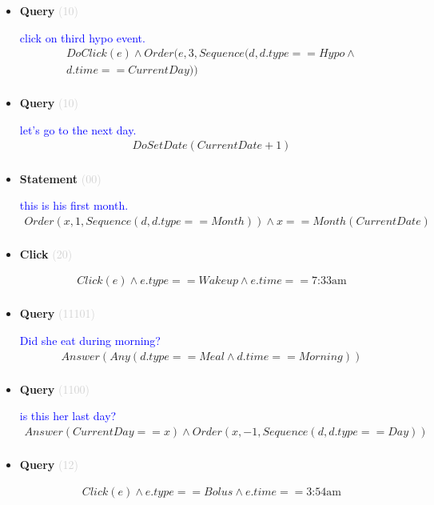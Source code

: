 \documentclass[11pt]{article}
\newcommand{\key}[1]{\textcolor{lightgray}{#1}}
\newcounter{CQuery}
\newcounter{CStatement}
\newcounter{CClick}
\begin{document}
\begin{itemize}
\item
\textbf{Query\theCQuery} \key{(10)} \addtocounter{CQuery}{1}
\textcolor{blue}{ click on third hypo event. }
\begin{multline*}
DoClick(e) \wedge  Order(e, 3, Sequence(d, d.type==Hypo \wedge \\ 
d.time==CurrentDay)) \\ 
\end{multline*}


\item
\textbf{Query\theCQuery} \key{(10)} \addtocounter{CQuery}{1}
\textcolor{blue}{ let's go to the next day. }
\begin{multline*}
DoSetDate(CurrentDate + 1) \\ 
\end{multline*}


\item
\textbf{Statement\theCStatement} \key{(00)} \addtocounter{CStatement}{1}
\textcolor{blue}{ this is his first month. }
\begin{multline*}
Order(x, 1, Sequence(d, d.type==Month)) \wedge x==Month(CurrentDate) \\ 
\end{multline*}


\item
\textbf{Click\theCClick} \key{(20)} \addtocounter{CClick}{1}
\textcolor{blue}{  }
\begin{multline*}
Click(e) \wedge e.type==Wakeup \wedge e.time==\mbox{7:33am} \\ 
\end{multline*}


\item
\textbf{Query\theCQuery} \key{(11101)} \addtocounter{CQuery}{1}
\textcolor{blue}{ Did she eat during morning? }
\begin{multline*}
Answer(Any(d.type==Meal \wedge d.time==Morning)) \\ 
\end{multline*}


\item
\textbf{Query\theCQuery} \key{(1100)} \addtocounter{CQuery}{1}
\textcolor{blue}{ is this her last day? }
\begin{multline*}
Answer(CurrentDay==x) \wedge Order(x, -1, Sequence(d, d.type==Day)) \\ 
\end{multline*}


\item
\textbf{Query\theCQuery} \key{(12)} \addtocounter{CQuery}{1}
\textcolor{blue}{  }
\begin{multline*}
Click(e) \wedge e.type == Bolus \wedge e.time==\mbox{3:54am} \\ 
\end{multline*}



\end{itemize}
\end{document}
